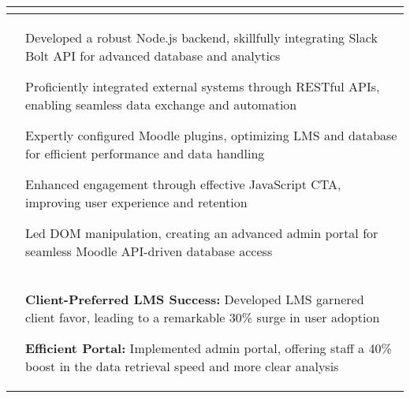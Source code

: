 \documentclass[10pt]{extarticle}
\begin{document}
{\begin{flushleft}
\begin{center}
\begin{tabularx}{\textwidth}{ p{1.7cm} | X }
\begin{tabitemize}
\end{tabitemize}\\
\hline
\centering\multirow{1}{*}{\textbf{Approach}} & 
\begin{tabitemize}
    \item Developed a robust Node.js backend, skillfully integrating Slack Bolt API for advanced database and analytics 
    \item Proficiently integrated external systems through RESTful APIs, enabling seamless data exchange and automation
    \item Expertly configured Moodle plugins, optimizing LMS and database for efficient performance and data handling
    \item  Enhanced engagement through effective JavaScript CTA, improving user experience and retention
    \item Led DOM manipulation, creating an advanced admin portal for seamless Moodle API-driven database access
\end{tabitemize}\\

\hline
\centering\multirow{1}{*}{\textbf{Impact}}& 
\begin{tabitemize}
\item \textbf{Client-Preferred LMS Success:} Developed LMS garnered client favor, leading to a remarkable 30\% surge in user adoption
    \item \textbf{Efficient Portal:} Implemented admin portal, offering staff a 40\% boost in the data retrieval speed and more clear analysis





\end{tabitemize}\\
\end{tabularx}
\end{center}


\end{flushleft}}
\end{document}

